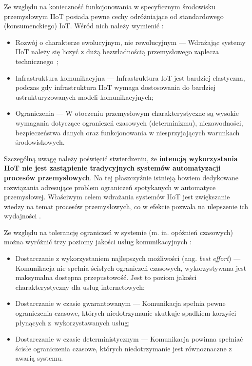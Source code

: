 \documentclass[a4paper, 12pt, twoside]{article}
\begin{document}
Ze względu na konieczność funkcjonowania w specyficznym środowisku przemysłowym
IIoT posiada pewne cechy odróżniające od standardowego (konsumenckiego) IoT.
Wśród nich należy wymienić \cite{iiot-challenges-opportunities-directions}:
\begin{itemize}
      \itemsep0em
      \item Rozwój o charakterze ewolucyjnym, nie rewolucyjnym
            --- Wdrażając systemy IIoT należy się liczyć z dużą bezwładnością
            przemysłowego zaplecza technicznego~\cite{isp};
      \item Infrastruktura komunikacyjna
            --- Infrastruktura IoT jest bardziej elastyczna, podczas gdy infrastruktura
            IIoT wymaga dostosowania do bardziej ustrukturyzowanych modeli komunikacyjnych;
      \item Ograniczenia
            --- W otoczeniu przemysłowym charakterystyczne są wysokie wymagania dotyczące
            ograniczeń czasowych (determinizmu), niezawodności, bezpieczeństwa danych oraz
            funkcjonowania w niesprzyjających warunkach środowiskowych.
\end{itemize}

Szczególną uwagę należy poświęcić stwierdzeniu, że \textbf{intencją wykorzystania IIoT nie
      jest zastąpienie tradycyjnych systemów automatyzacji procesów przemysłowych}.
Na tej płaszczyźnie istnieją bowiem dedykowane rozwiązania adresujące
problem ograniczeń spotykanych w automatyce przemysłowej.
Właściwym celem wdrażania systemów IIoT jest zwiększanie wiedzy na temat procesów
przemysłowych, co w efekcie pozwala na ulepszenie ich wydajności \cite{iiot-challenges-opportunities-directions}.

Ze względu na tolerancję ograniczeń w systemie (m. in. opóźnień czasowych) można
wyróżnić trzy poziomy jakości usług komunikacyjnych \cite{iot-hype-to-reality}:
\begin{itemize}
      \itemsep0em
      \item Dostarczanie z wykorzystaniem najlepszych możliwości (ang. \emph{best effort})
            --- Komunikacja nie spełnia ścisłych ograniczeń czasowych, wykorzystywana jest
            maksymalna dostępna przepustowość. Jest to poziom jakości charakterystyczny
            dla usług internetowych;
      \item Dostarczanie w czasie gwarantowanym
            --- Komunikacja spełnia pewne ograniczenia czasowe, których niedotrzymanie
            skutkuje spadkiem korzyści płynących z~wykorzystawanych usług;
      \item Dostarczanie w czasie deterministycznym
            --- Komunikacja powinna spełniać ścisłe ograniczenia czasowe,
            których niedotrzymanie jest równoznaczne z awarią systemu.
\end{itemize}
\end{document}
